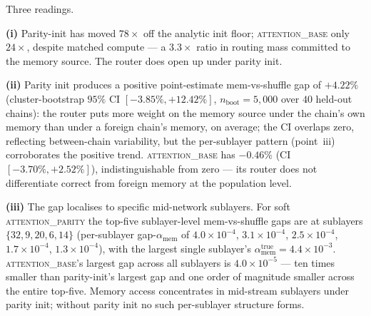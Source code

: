 \documentclass{article}
\begin{document}
Three readings.

\textbf{(i)} Parity-init has moved $78\times$ off the analytic init
floor; \textsc{attention\_base} only $24\times$, despite matched
compute --- a $3.3\times$ ratio in routing mass committed to the
memory source.  The router does open up under parity init.

\textbf{(ii)} Parity init produces a positive point-estimate
mem-vs-shuffle gap of $+4.22\%$ (cluster-bootstrap $95\%$
CI $[-3.85\%, +12.42\%]$, $n_{\text{boot}}{=}5{,}000$ over $40$
held-out chains): the router puts more weight on the memory source
under the chain's own memory than under a foreign chain's memory, on
average; the CI overlaps zero, reflecting between-chain variability,
but the per-sublayer pattern (point~iii) corroborates the
positive trend.  \textsc{attention\_base} has $-0.46\%$ (CI
$[-3.70\%, +2.52\%]$), indistinguishable from zero --- its router
does not differentiate correct from foreign memory at the population
level.

\textbf{(iii)} The gap localises to specific mid-network sublayers.
For soft \textsc{attention\_parity} the top-five sublayer-level
mem-vs-shuffle gaps are at sublayers
$\{32, 9, 20, 6, 14\}$ (per-sublayer gap-$\alpha_{\text{mem}}$ of
$4.0{\times}10^{-4}$, $3.1{\times}10^{-4}$, $2.5{\times}10^{-4}$,
$1.7{\times}10^{-4}$, $1.3{\times}10^{-4}$), with the largest single
sublayer's $\alpha_{\text{mem}}^{\text{true}} = 4.4{\times}10^{-3}$.
\textsc{attention\_base}'s largest gap across all sublayers is
$4.0{\times}10^{-5}$ --- ten times smaller than parity-init's largest
gap and one order of magnitude smaller across the entire top-five.
Memory access concentrates in mid-stream sublayers under parity init;
without parity init no such per-sublayer structure forms.
\end{document}
